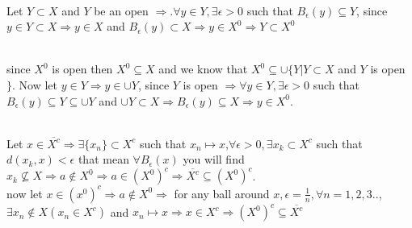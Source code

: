 \documentclass{amsbook}
\begin{document}
\begin{tcolorbox}
{\color{red}{(g)-If $Y$ is an open subset of $M$ such that $Y\subset X\subset M$, 
then $Y\subset X^0$.}}\\
Let $Y\subset X$ and $Y$ be an open $\Rightarrow.\forall y\in Y,\exists\epsilon>0$ 
such that $B_\epsilon(y)\subseteq Y$, since $y\in Y\subset X\Rightarrow y\in X$ and 
$B_\epsilon (y)\subset X\Rightarrow y\in X^0\Longrightarrow Y\subset X^0$

{}\\
since $X^0$ is open then $X^0\subseteq X$ and we know that $X^0\subseteq
\cup \{Y|Y\subset X$ and $Y$ is open $\}$. Now let $y\in Y\Rightarrow y\in \cup Y$, since $Y$ is open 
$\Rightarrow\forall y\in Y,\exists\epsilon>0$ such that 
$B_\epsilon(y)\subseteq Y\subseteq\cup Y$ and $\cup Y\subset 
X\Rightarrow B_\epsilon(y)\subseteq X\Rightarrow y\in X^0$.

{}\\
Let $x\in \overline{X^c}\Rightarrow\exists\{x_n\}\subset X^c$ such that $x_n\mapsto 
x$,$\forall\epsilon>0,\exists x_k\subset X^c$ such that
$d(x_k,x)<\epsilon$ that mean $\forall B_\epsilon(x)$ you will find $x_k\nsubseteq X\Rightarrow a\notin 
X^0\Rightarrow a\in (X^0)^c\Rightarrow \overline{X^c}\subseteq(X^0)^c$.\\
now let $x\in (x^0)^c\Rightarrow a\notin X^0\Rightarrow$ for any ball around $x,\epsilon=\frac{1}{n},\forall 
n=1,2,3..$, $\exists x_n\notin X(x_n \in X^c)$ and $x_n\mapsto x\Rightarrow x\in X^c\Rightarrow (X^0)^c\subseteq
\overline{X^c}$
\end{tcolorbox}
\end{document}
